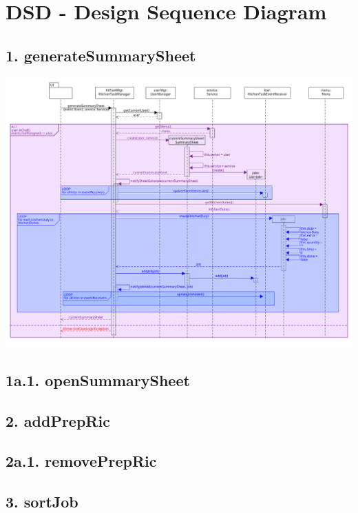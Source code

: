 \chapter{DSD - Design Sequence Diagram}

\section*{1. generateSummarySheet}

\begin{center}
  \includegraphics[scale = 0.32]{images/DSD/DSD 1.png}
\end{center}

\pagebreak 

\section*{1a.1. openSummarySheet}

\pagebreak

\section*{2. addPrepRic}

\pagebreak

\section*{2a.1. removePrepRic}

\pagebreak

\section*{3. sortJob}

